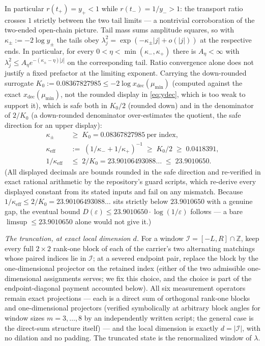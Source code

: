 \documentclass[11pt]{article}
\theoremstyle{remark}
\newcommand{\keff}{\kappa_{\mathrm{eff}}}
\newcommand{\eps}{\varepsilon}
\begin{document}
In particular $r(t_+)=y_+<1$ while $r(t_-)=1/y_->1$: the transport ratio
crosses $1$ strictly between the two tail limits --- a nontrivial
corroboration of the two-ended open-chain picture.
Tail mass sums amplitude squares, so with $\kappa_\pm:=-2\log y_\pm$ the
tails obey $\lambda_j^2=\exp(-\kappa_\pm|j|+o(|j|))$ at the
respective ends. In particular, for every $0<\eta<\min(\kappa_-,\kappa_+)$
there is $A_\eta<\infty$ with
$\lambda_j^2\le A_\eta e^{-(\kappa_\pm-\eta)|j|}$ on the corresponding
tail. Ratio convergence alone does not justify a fixed prefactor at the
limiting exponent. Carrying the down-rounded surrogate
$K_0 := 0.08367827985 \le -2\log x_{\mathrm{dec}}(\mu_{\min})$ (computed
against the exact $x_{\mathrm{dec}}(\mu_{\min})$, not the rounded display
in \eqref{eq:ydec}, which is too weak to support it), which is safe both
in $K_0/2$ (rounded down) and in the denominator of
$2/K_0$ (a down-rounded denominator over-estimates the quotient, the safe
direction for an upper display):
\begin{equation}\label{eq:kappa}
\begin{aligned}
\kappa_\pm \;&\ge\; K_0 = 0.08367827985 \ \text{per index},\\
\keff \;&:=\; (1/\kappa_- + 1/\kappa_+)^{-1} \;\ge\; K_0/2 \;\ge\;
0.0418391,\\
1/\keff \;&\le\; 2/K_0 = 23.90106493088\ldots \;\le\; 23.9010650.
\end{aligned}
\end{equation}
(All displayed decimals are bounds rounded in the safe direction and
re-verified in exact rational arithmetic by the repository's guard
scripts, which re-derive every displayed constant from its stated inputs
and fail on any mismatch. Because $1/\keff\le 2/K_0 =
23.90106493088\ldots$ sits strictly below $23.9010650$ with a genuine
gap, the eventual bound $D(\eps)\le 23.9010650\cdot\log(1/\eps)$ follows
--- a bare $\limsup\le 23.9010650$ alone would not give it.)

\emph{The truncation, at exact local dimension $d$.} For a window
$\mathcal{I}=[-L,R]\cap\mathbb{Z}$, keep every full $2\times2$ rank-one block of
each of the carrier's two alternating matchings whose paired indices lie
in $\mathcal{I}$; at a severed endpoint pair, replace the block by the
one-dimensional projector on the retained index (either of the two
admissible one-dimensional assignments serves; we fix this choice, and the
choice is part of the endpoint-diagonal payment accounted below). All
six measurement
operators remain exact projections --- each is a direct sum of orthogonal
rank-one blocks and one-dimensional projectors (verified symbolically at
arbitrary block angles for window sizes $m=3,\ldots,8$ by an
independently written script; the general case is the direct-sum
structure itself) --- and the local dimension is exactly $d=|\mathcal{I}|$, with no
dilation and no padding. The truncated state is the renormalized window
of $\lambda$.
\end{document}
